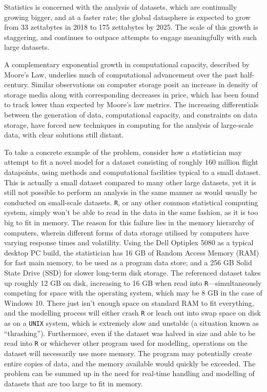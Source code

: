Statistics is concerned with the analysis of datasets, which are continually growing bigger, and at a faster rate;
the global datasphere is expected to grow from 33 zettabytes in 2018 to 175 zettabytes by 2025\cite{rydning2018digitization}.
The scale of this growth is staggering, and continues to outpace attempts to engage meaningfully with such large datasets.

A complementary exponential growth in computational capacity, described by Moore's Law, underlies much of computational advancement over the past half-century\cite{moore1975progress}.
Similar observations on computer storage posit an increase in density of storage media along with corresponding decreases in price, which has been found to track lower than expected by Moore's law metrics\cite{fontana2018moore}.
The increasing differentials between the generation of data, computational capacity, and constraints on data storage, have forced new techniques in computing for the analysis of large-scale data, with clear solutions still distant.

To take a concrete example of the problem, consider how a statistician may attempt to fit a novel model for a dataset consisting of roughly 160 million flight datapoints\cite{bot2009flights}, using methods and computational facilities typical to a small dataset.
This is actually a small dataset compared to many other large datasets, yet it is still not possible to perform an analysis in the same manner as would usually be conducted on small-scale datasets.
\texttt{R}, or any other common statistical computing system, simply won't be able to read in the data in the same fashion, as it is too big to fit in memory.
The reason for this failure lies in the memory hierarchy of computers, wherein different forms of data storage utilised by computers have varying response times and volatility.
Using the Dell Optiplex 5080 as a typical desktop PC build, the statistician has 16 GB of Random Access Memory (RAM) for fast main memory, to be used as a program data store; and a 256 GB Solid State Drive (SSD) for slower long-term disk  storage\cite{cornell2021standardcomp}.
The referenced dataset takes up roughly 12 GB on disk, increasing to 16 GB when read into \texttt{R}---simultaneously competing for space with the operating system, which may be 8 GB in the case of Windows 10.
There just isn't enough space on standard RAM to fit everything, and the modelling process will either crash \texttt{R} or leach out into swap space on disk as on a \texttt{UNIX} system, which is extremely slow and unstable (a situation known as ``thrashing'')\cite{denning1968thrashing}.
Furthermore, even if the dataset was halved in size and able to be read into \texttt{R} or whichever other program used for modelling, operations on the dataset will necessarily use more memory.
The program may potentially create entire copies of data, and the memory available would quickly be exceeded.
The problem can be summed up in the need for real-time handling and modelling of datasets that are too large to fit in memory.

